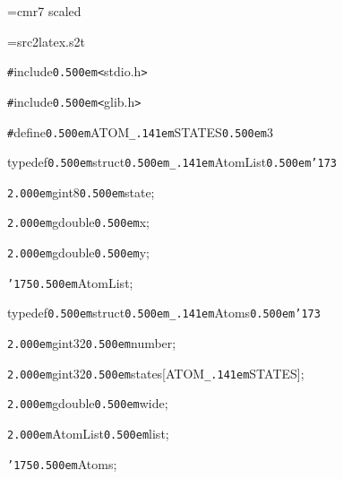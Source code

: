 

\ifx\sevenrm\undefined
  \font\sevenrm=cmr7 scaled 
\fi

\newread\MyStyle
\openin\MyStyle=src2latex.s2t
\ifeof\MyStyle
  \closein\MyStyle
\else
  
  \closein\MyStyle
\fi

\ifx\gtfam\undefined
  \ifx\dm\undefined
    \ifx\tendm\undefined
      \def\mc{\null}
    \else
      \def\mc{\tendm}
    \fi
  \else
    \def\mc{\dm}
  \fi
  \ifx\dg\undefined
    \ifx\tendg\undefined
      \def\gt{\null}
    \else
      \def\gt{\tendg}
    \fi
  \else
    \def\gt{\dg}
  \fi
\fi
\ifx\sc\undefined
  \def\sc{\null}
\fi

\tt\mc 

\noindent
{\tt\#}include{\tt\mc \kern0.500em}{\tt <}stdio.h{\tt >}

\noindent
{}{\tt\#}include{\tt\mc \kern0.500em}{\tt <}glib.h{\tt >}

\noindent
{}\hfill

\noindent
{}{\tt\#}define{\tt\mc \kern0.500em}ATOM{\tt\_\kern.141em}STATES{\tt\mc \kern0.500em}3

\noindent
{}\hfill

\noindent
{}typedef{\tt\mc \kern0.500em}struct{\tt\mc \kern0.500em}{\tt\_\kern.141em}AtomList{\tt\mc \kern0.500em}{\tt\char'173}

\noindent
{}{\tt\mc \kern2.000em}gint8{\tt\mc \kern0.500em}state;

\noindent
{}{\tt\mc \kern2.000em}gdouble{\tt\mc \kern0.500em}x;

\noindent
{}{\tt\mc \kern2.000em}gdouble{\tt\mc \kern0.500em}y;

\noindent
{}{\tt\char'175}{\tt\mc \kern0.500em}AtomList;

\noindent
{}\hfill

\noindent
{}typedef{\tt\mc \kern0.500em}struct{\tt\mc \kern0.500em}{\tt\_\kern.141em}Atoms{\tt\mc \kern0.500em}{\tt\char'173}

\noindent
{}{\tt\mc \kern2.000em}gint32{\tt\mc \kern0.500em}number;

\noindent
{}{\tt\mc \kern2.000em}gint32{\tt\mc \kern0.500em}states[ATOM{\tt\_\kern.141em}STATES];

\noindent
{}{\tt\mc \kern2.000em}gdouble{\tt\mc \kern0.500em}wide;

\noindent
{}{\tt\mc \kern2.000em}AtomList{\tt\mc \kern0.500em}{\tt *}list;

\noindent
{}{\tt\char'175}{\tt\mc \kern0.500em}Atoms;


